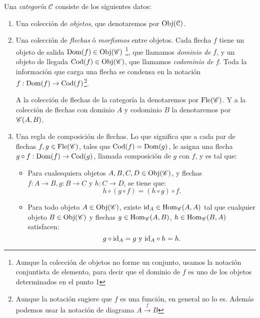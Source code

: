 \documentclass{comunicaciones}
\begin{document}
\begin{dfn}[Categoría]\label{Definicion categoria}
 Una \emph{categoría} $\mathcal{C}$ consiste de los siguientes datos:
 \begin{enumerate}
        \item Una colección de \emph{objetos}, que denotaremos por $\mathrm{Obj}(\mathcal{C})$.
        \item Una colección de \emph{flechas} ó \emph{morfismos} entre objetos. Cada flecha $f$ tiene un objeto
        de salida $\mathrm{Dom}(f)\in\mathrm{Obj}(\mathscr C)$ \footnote{Aunque la colección de objetos 
        no forme un conjunto, usamos la notación conjuntista de elemento, para decir
        que el dominio de $f$ es uno de los objetos determinados en el punto 1},
        que llamamos \emph{dominio de} $f$, y un objeto de llegada 
        $\mathrm{Cod}(f)\in\mathrm{Obj}(\mathscr C)$, que llamamos \emph{codominio de} $f$. Toda la información
        que carga una flecha se condensa en la notación $f:\mathrm{Dom}(f)\to\mathrm{Cod}(f)$\footnote{
        Aunque la notación sugiere que $f$ es una función, en general no lo es. Además podemos
        usar la notación de diagrama $A\xrightarrow{f}B$}. 

        A la colección de flechas de la categoría la denotaremos por $\mathrm{Fle}(\mathscr C)$. Y a la colección 
        de flechas con dominio $A$ y codominio $B$ la denotaremos por $\mathscr C(A,B)$.
        \item Una regla de composición de flechas. Lo que significa que a cada par de flechas $f,g\in\mathrm{Fle}(\mathscr C)$, tales que $\mathrm{Cod}(f)=\mathrm{Dom}(g)$, 
        le asigna una flecha $g\circ f:\mathrm{Dom}(f)\to \mathrm{Cod}(g)$, llamada composición de $g$ con $f$, y es tal que: 

                
        \begin{itemize}
            \item Para cualesquiera objetos $A,B,C,D\in\mathrm{Obj}(\mathscr C)$, y flechas $f:A\to B,g:B\to C$ y $h:C\to D$, se tiene que:
            $$h\circ(g\circ f) = (h\circ g)\circ f.$$
            
            \item Para todo objeto $A\in\mathrm{Obj}(\mathscr C)$, existe $\mathrm{id}_A\in\mathrm{Hom}_\mathscr C( A,A)$ tal que cualquier objeto $B\in\mathrm{Obj}(\mathscr C)$ y flechas $g\in\mathrm{Hom}_\mathscr C(A,B)$, $h\in\mathrm{Hom}_\mathscr C(B,A)$ satisfacen:
            $$g\circ \mathrm{id}_A=g\text{ y }\mathrm{id}_A\circ h=h.$$
        \end{itemize}
 \end{enumerate}
\end{dfn}
\end{document}
